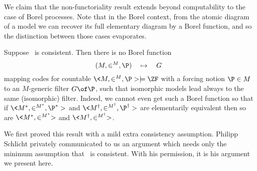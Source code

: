 \documentclass{amsart}
\begin{document}
 We claim that the non-functoriality result extends beyond computability to the case of Borel processes. Note that in the Borel context, from the atomic diagram of a model we can recover its full elementary diagram by a Borel function, and so the distinction between those cases evaporates.
 
 \begin{theorem}\label{thm:Borel}
 Suppose \ZF\ is consistent. Then there is no Borel function
   $$(M,\in^M,\P)\quad\mapsto\quad G$$
  mapping codes for countable $\<M,\in^M,\P> \models \ZF$ with a forcing notion $\P\in M$ to an $M$-generic filter $G\of\P$, such that isomorphic models lead always to the same (isomorphic) filter. Indeed, we cannot even get such a Borel function so that if $\<M^*,\in^{M^*},\P^*>$ and $\<M^\dagger,\in^{M^\dagger},\P^\dagger>$ are elementarily equivalent then so are $\<M^*,\in^{M^*}>$ and $\<M^\dagger,\in^{M^\dagger}>$.
 \end{theorem}
 
 We first proved this result with a mild extra consistency assumption. Philipp Schlicht privately communicated to us an argument which needs only the minimum assumption that \ZF\ is consistent. With his permission, it is his argument we present here.
 
\end{document}
